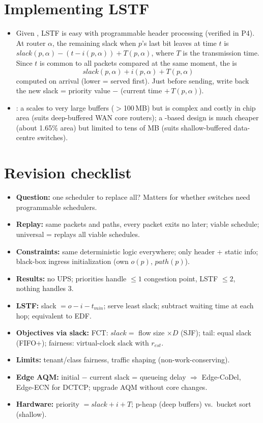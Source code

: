 \section{Implementing LSTF}
\begin{itemize}
\item Given , LSTF is easy with programmable header processing (verified in P4). At router $\alpha$, the remaining slack when $p$'s last bit leaves at time $t$ is $slack(p,\alpha) - (t - i(p,\alpha)) + T(p,\alpha)$, where $T$ is the transmission time. Since $t$ is common to all packets compared at the same moment, the  is
\[ slack(p,\alpha) + i(p,\alpha) + T(p,\alpha) \]
computed on arrival (lower = served first). Just before sending, write back the new slack = priority value $-$ (current time $+\,T(p,\alpha)$).
\item {}: a  scales to very large buffers ($>$100\,MB) but is complex and costly in chip area (suits deep-buffered WAN core routers); a -based design is much cheaper (about 1.65\% area) but limited to tens of MB (suits shallow-buffered data-centre switches).
\end{itemize}

\section{Revision checklist}
\begin{itemize}
\item \textbf{Question:} one scheduler to replace all? Matters for whether switches need programmable schedulers.
\item \textbf{Replay:} same packets and paths, every packet exits no later; viable schedule; universal = replays all viable schedules.
\item \textbf{Constraints:} same deterministic logic everywhere; only header + static info; black-box ingress initialization (own $o(p)$, $path(p)$).
\item \textbf{Results:} no UPS; priorities handle $\le1$ congestion point, LSTF $\le2$, nothing handles 3.
\item \textbf{LSTF:} slack $= o - i - t_{min}$; serve least slack; subtract waiting time at each hop; equivalent to EDF.
\item \textbf{Objectives via slack:} FCT: $slack = $ flow size $\times D$ (SJF); tail: equal slack (FIFO+); fairness: virtual-clock slack with $r_{est}$.
\item \textbf{Limits:} tenant/class fairness, traffic shaping (non-work-conserving).
\item \textbf{Edge AQM:} initial $-$ current slack = queueing delay $\Rightarrow$ Edge-CoDel, Edge-ECN for DCTCP; upgrade AQM without core changes.
\item \textbf{Hardware:} priority $= slack + i + T$; p-heap (deep buffers) vs.\ bucket sort (shallow).
\end{itemize}

